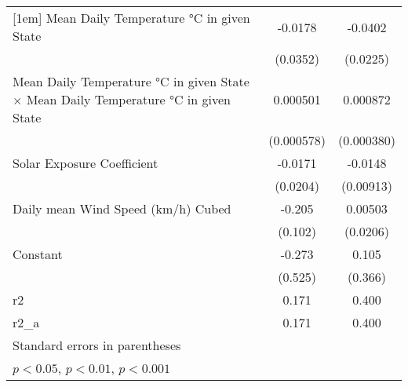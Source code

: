 {\begin{tabular}{l*{2}{c}}
[1em]
Mean Daily Temperature °C in given State&     -0.0178         &     -0.0402         \\
                    &    (0.0352)         &    (0.0225)         \\
[1em]
Mean Daily Temperature °C in given State $\times$ Mean Daily Temperature °C in given State&    0.000501         &    0.000872         \\
                    &  (0.000578)         &  (0.000380)         \\
[1em]
Solar Exposure Coefficient&     -0.0171         &     -0.0148         \\
                    &    (0.0204)         &   (0.00913)         \\
[1em]
Daily mean Wind Speed (km/h) Cubed&      -0.205         &     0.00503         \\
                    &     (0.102)         &    (0.0206)         \\
[1em]
Constant            &      -0.273         &       0.105         \\
                    &     (0.525)         &     (0.366)         \\
\hline
r2                  &       0.171         &       0.400         \\
r2\_a                &       0.171         &       0.400         \\
\hline\hline
\multicolumn{3}{l}{\footnotesize Standard errors in parentheses}\\
\multicolumn{3}{l}{\footnotesize \sym{*} \(p<0.05\), \sym{**} \(p<0.01\), \sym{***} \(p<0.001\)}\\
\end{tabular}
}
